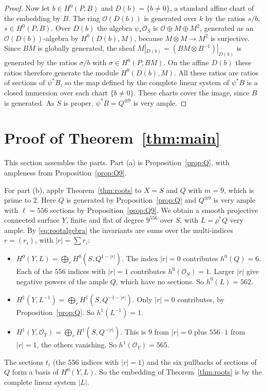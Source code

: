 \documentclass[11pt,a4paper]{article}
\theoremstyle{plain}
\theoremstyle{remark}
\newcommand{\OO}{\mathcal O}
\begin{document}
\begin{proof}
Now let $b\in H^0(P,B)$ and $D(b)=\{b\ne0\}$, a standard affine chart of the embedding by $B$. The ring $\OO(D(b))$ is
generated over $k$ by the ratios $s/b$, $s\in H^0(P,B)$. Over $D(b)$ the algebra $\psi_*\OO_S$ is
$\OO\oplus M\oplus M^2$, generated as an $\OO(D(b))$-algebra by $H^0(D(b),M)$, because $M\otimes M\to M^2$ is
surjective. Since $BM$ is globally generated, the sheaf $M|_{D(b)}=(BM\otimes B^{-1})|_{D(b)}$ is generated by the
ratios $\sigma/b$ with $\sigma\in H^0(P,BM)$. On the affine $D(b)$ these ratios therefore generate the module
$H^0(D(b),M)$. All these ratios are ratios of sections of $\psi^*B$, so the map defined by the complete linear system
of $\psi^*B$ is a closed immersion over each chart $\{b\ne0\}$. These charts cover the image, since $B$ is generated.
As $S$ is proper, $\psi^*B=Q^{\otimes 9}$ is very ample.
\end{proof}

\section{Proof of Theorem~\ref{thm:main}}

This section assembles the parts. Part (a) is Proposition~\ref{prop:Q}, with ampleness from
Proposition~\ref{prop:Q9}.

For part (b), apply Theorem~\ref{thm:roots} to $X=S$ and $Q$ with $m=9$, which is prime to $2$. Here $Q$ is generated
by Proposition~\ref{prop:Q} and $Q^{\otimes9}$ is very ample with $\ell=556$ sections by Proposition~\ref{prop:Q9}. We
obtain a smooth projective connected surface $Y$, finite and flat of degree $9^{556}$ over $S$, with $L=\rho^*Q$ very
ample. By \eqref{eq:rootalgebra} the invariants are sums over the multi-indices $r=(r_i)$, with $|r|=\sum r_i$:
\begin{itemize}
\item $H^0(Y,L)=\bigoplus_rH^0(S,Q^{1-|r|})$. The index $|r|=0$ contributes $h^0(Q)=6$. Each of the $556$ indices with
$|r|=1$ contributes $h^0(\OO_S)=1$. Larger $|r|$ give negative powers of the ample $Q$, which have no sections. So
$h^0(L)=562$.
\item $H^1(Y,L^{-1})=\bigoplus_rH^1(S,Q^{-1-|r|})$. Only $|r|=0$ contributes, by Proposition~\ref{prop:Q}. So
$h^1(L^{-1})=1$.
\item $H^1(Y,\OO_Y)=\bigoplus_rH^1(S,Q^{-|r|})$. This is $9$ from $|r|=0$ plus $556\cdot1$ from $|r|=1$, the others
vanishing. So $h^1(\OO_Y)=565$.
\end{itemize}
The sections $t_i$ (the $556$ indices with $|r|=1$) and the six pullbacks of sections of $Q$ form a basis of $H^0(Y,L)$.
So the embedding of Theorem~\ref{thm:roots} is by the complete linear system $|L|$.
\end{document}
